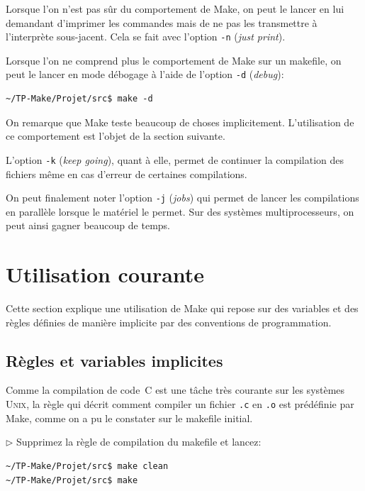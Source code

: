 \documentclass[11pt,a4paper]{article}
\newcommand{\must}{\noindent $\triangleright$ \xspace}
\begin{document}
\noindent Lorsque l'on n'est pas sûr du comportement de \textsf{Make},
on peut le lancer en lui demandant d'imprimer les commandes mais de
ne pas les transmettre à l'interprète sous-jacent. Cela se fait avec
l'option \texttt{-n} (\emph{just print}).

\medskip

\noindent Lorsque l'on ne comprend plus le comportement de
\textsf{Make} sur un makefile, on peut le lancer en mode
débogage à l'aide de l'option \texttt{-d} (\emph{debug}):
{\small
\begin{verbatim}
~/TP-Make/Projet/src$ make -d
\end{verbatim}
}
\noindent On remarque que \textsf{Make} teste beaucoup de choses
implicitement. L'utilisation de ce comportement est l'objet de la
section suivante.

\medskip

\noindent L'option \texttt{-k} (\emph{keep going}), quant à elle,
permet de continuer la compilation des fichiers même en cas d'erreur
de certaines compilations.

\medskip

\noindent On peut finalement noter l'option \texttt{-j} (\emph{jobs})
qui permet de lancer les compilations en parallèle lorsque le matériel
le permet. Sur des systèmes multiprocesseurs, on peut ainsi gagner
beaucoup de temps.

\section{Utilisation courante}

Cette section explique une utilisation de \textsf{Make} qui repose sur
des variables et des règles définies de manière implicite par des
conventions de programmation.

\subsection{Règles et variables implicites}

Comme la compilation de code~C est une tâche très courante sur les
systèmes \textsc{Unix}, la règle qui décrit comment compiler un
fichier \texttt{.c} en \texttt{.o} est prédéfinie par \textsf{Make},
comme on a pu le constater sur le makefile initial.

\medskip

\must Supprimez la règle de compilation du makefile et
lancez:
{\small
\begin{verbatim}
~/TP-Make/Projet/src$ make clean
~/TP-Make/Projet/src$ make
\end{verbatim}
}
\end{document}
